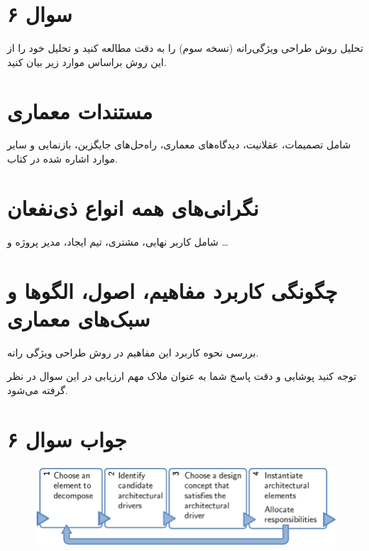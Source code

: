 \section*{سوال ۶}

تحلیل روش طراحی ویژگی‌رانه (نسخه سوم) را به دقت مطالعه کنید و تحلیل خود را از این روش براساس موارد زیر بیان کنید.

\section*{مستندات معماری}
شامل تصمیمات، عقلانیت، دیدگاه‌های معماری، راه‌حل‌های جایگزین، بازنمایی و سایر موارد اشاره شده در کتاب.

\section*{نگرانی‌های همه انواع ذی‌نفعان}
شامل کاربر نهایی، مشتری، تیم ایجاد، مدیر پروژه و …

\section*{چگونگی کاربرد مفاهیم، اصول، الگوها و سبک‌های معماری}
بررسی نحوه کاربرد این مفاهیم در روش طراحی ویژگی رانه.

توجه کنید پوشایی و دقت پاسخ شما به عنوان ملاک مهم ارزیابی در این سوال در نظر گرفته می‌شود.

\section*{جواب سوال ۶}

\begin{figure}[H]
	\centering
	\includegraphics{pic10.png}
	\label{fig:label4}
\end{figure}

